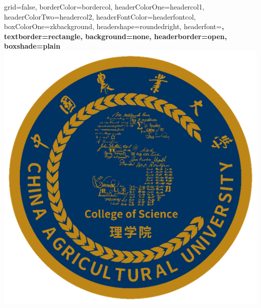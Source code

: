 \documentclass[a0paper,portrait]{baposter}
\begin{document}


\begin{poster}{
grid=false,
borderColor=bordercol, %
headerColorOne=headercol1, %
headerColorTwo=headercol2, %
headerFontColor=headerfontcol, %
boxColorOne=zkbackground,
headershape=roundedright, %
headerfont=\Large\sf\bf, %
textborder=rectangle,
background=none,
headerborder=open, %
boxshade=plain
}
%
%
{\includegraphics[scale=0.401]{logo_cau_science.png}} %

\end{poster}
\end{document}
